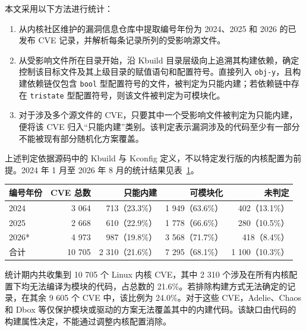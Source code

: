 本文采用以下方法进行统计：

\begin{enumerate}
    \item 从内核社区维护的漏洞信息仓库中提取编号年份为 2024、2025 和 2026 的已发布 CVE 记录，并解析每条记录所列的受影响源文件。
    
    \item 从受影响文件所在目录开始，沿 Kbuild 目录层级向上追溯其构建依赖，确定控制该目标文件及其上级目录的赋值语句和配置符号。直接列入 \lstinline[breaklines=false]@obj-y@，且构建依赖链仅包含 \lstinline[breaklines=false]@bool@ 型配置符号的文件，被判定为只能内建；若依赖链中存在 \lstinline[breaklines=false]@tristate@ 型配置符号，则该文件被判定为可模块化。
    
    \item 对于涉及多个源文件的 CVE，只要其中一个受影响文件被判定为只能内建，便将该 CVE 归入“只能内建”类别。该判定表示漏洞涉及的代码至少有一部分不能被现有部分随机化方案覆盖。
\end{enumerate}

上述判定依据源码中的 Kbuild 与 Kconfig 定义，不以特定发行版的内核配置为前提。2024 年 1 月至 2026 年 8 月的统计结果见表~\ref{tab:1-2}。

\begin{table}[!htbp]
    \label{tab:1-2}
    \centering
    \footnotesize
    \setlength{\tabcolsep}{3pt}
    \renewcommand{\arraystretch}{1.25}
    \begin{tabular}{lrrrr}
        \hline
        编号年份 & CVE 总数 & 只能内建 & 可模块化 & 未判定\\
        \hline
        2024 & 3 064 & 713（23.3\%） & 1 949（63.6\%） & 402（13.1\%）\\
        2025 & 2 668 & 610（22.9\%） & 1 778（66.6\%） & 280（10.5\%）\\
        2026* & 4 973 & 987（19.8\%） & 3 568（71.7\%） & 418（8.4\%）\\
        合计 & 10 705 & 2 310（21.6\%） & 7 295（68.1\%） & 1 100（10.3\%）\\
        \hline
    \end{tabular}
\end{table}

统计期内共收集到 10 705 个 Linux 内核 CVE，其中 2 310 个涉及在所有内核配置下均无法编译为模块的代码，占总数的 21.6\%。若排除构建方式无法确定的记录，在其余 9 605 个 CVE 中，该比例为 24.0\%。对于这些 CVE，Adelie、Chaos 和 Dbox 等仅保护模块或驱动的方案无法覆盖其中的内建代码。该缺口由代码的构建属性决定，不能通过调整内核配置消除。


